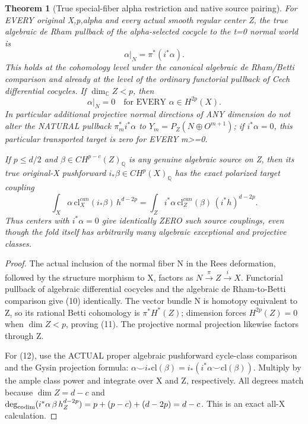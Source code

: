 \documentclass[11pt]{article}
\newtheorem{theorem}{Theorem}[section]
\begin{document}
\begin{theorem}[True special-fiber alpha restriction and native source pairing]
For EVERY original X,p,alpha and every
actual smooth regular center Z, the
true algebraic de Rham pullback of the
alpha-selected cocycle to the t=0
normal world is
\[
 \boxed{
 \alpha|_N=\pi^*(i^*\alpha).
 }                                                     \tag{10}
\]
This holds at the cohomology level under
the canonical algebraic de Rham/Betti
comparison and already at the level of
the ordinary functorial pullback of
Cech differential cocycles.
If $\dim_{\mathbb C}Z<p$, then
\[
 \boxed{\alpha|_N=0\quad
                \text{for EVERY }\alpha\in H^{2p}(X).}
                                                               \tag{11}
\]
In particular additional projective
normal directions of ANY dimension
do not alter the NATURAL pullback
$\pi_m^*i^*\alpha$ to
$Y_m=P_Z(N\oplus O^{m+1})$;
if $i^*\alpha=0$, this
particular transported target is zero
for EVERY m>=0.

If $p\le d/2$ and
$\beta\in CH^{p-c}(Z)_{\mathbb Q}$
is any genuine algebraic source on Z,
then its true original-X pushforward
$i_*\beta\in CH^p(X)_{\mathbb Q}$
has the exact polarized target coupling
\[
 \boxed{
 \int_X\alpha\,
          \mathrm{cl}^{can}_X(i_*\beta)\,
          h^{d-2p}
 =\int_Z i^*\alpha\,
          \mathrm{cl}^{can}_Z(\beta)\,
          (i^*h)^{d-2p}.
 }                                                     \tag{12}
\]
Thus centers with $i^*\alpha=0$
give identically ZERO such source
couplings, even though the fold itself
has arbitrarily many algebraic
exceptional and projective classes.
\end{theorem}
\begin{proof}
The actual inclusion of the normal
fiber N in the Rees deformation,
followed by the structure morphism
to X, factors as $N\xrightarrow{\pi}
Z\xrightarrow{i}X$. Functorial
pullback of algebraic differential
cocycles and the algebraic
de Rham-to-Betti comparison give
(10) identically. The vector bundle
N is homotopy equivalent to Z,
so its rational Betti cohomology
is $\pi^*H^*(Z)$; dimension
forces $H^{2p}(Z)=0$ when
$\dim Z<p$, proving (11).
The projective normal projection
likewise factors through Z.

For (12), use the ACTUAL proper
algebraic pushforward cycle-class
comparison and the Gysin
projection formula:
$\alpha\smile i_*\mathrm{cl}(\beta)
=i_*(i^*\alpha\smile\mathrm{cl}(\beta))$.
Multiply by the ample class power
and integrate over X and Z,
respectively. All degrees match
because $\dim Z=d-c$ and
$\deg_{\rm codim}
(i^*\alpha\,\beta\,h_Z^{d-2p})
=p+(p-c)+(d-2p)=d-c$.
This is an exact all-X calculation.
\end{proof}
\end{document}
